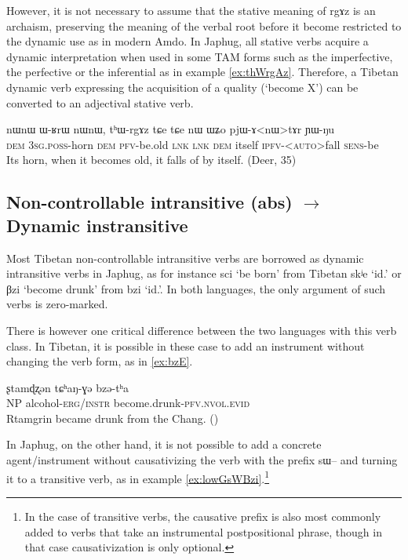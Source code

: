 \documentclass[oldfontcommands,oneside,a4paper,11pt]{article}
\newcommand{\ipa}[1]{{\phon \mbox{#1}}} %
\begin{document}
However, it is not necessary to assume that the stative meaning of \ipa{rgɤz} is an archaism, preserving the meaning of the verbal root before it become restricted to the dynamic use as in modern Amdo. In Japhug, all stative verbs acquire a dynamic interpretation when used in some TAM forms such as the imperfective, the perfective or the inferential as in example \ref{ex:thWrgAz}. Therefore, a Tibetan dynamic verb expressing the acquisition of a quality (`become X') can be converted to an adjectival stative verb.

\begin{exe}
\ex \label{ex:thWrgAz}
\gll
\ipa{nɯnɯ}  	\ipa{ɯ-ʁrɯ}  	\ipa{nɯnɯ,}  	\ipa{tʰɯ-rgɤz}  	\ipa{tɕe}  	\ipa{tɕe}  	\ipa{nɯ}  	\ipa{ɯʑo}  	\ipa{pjɯ-ɤ<nɯ>tɤr}  	\ipa{ɲɯ-ŋu}  \\
\textsc{dem} \textsc{3sg.poss}-horn \textsc{dem} \textsc{pfv}-be.old \textsc{lnk}  \textsc{lnk} \textsc{dem} itself \textsc{ipfv}-<\textsc{auto}>fall \textsc{sens}-be \\
\glt Its horn, when it becomes old, it falls of by itself. (Deer, 35)
\end{exe}


\subsection{Non-controllable intransitive (abs) $\rightarrow$ Dynamic instransitive}  
Most Tibetan non-controllable intransitive verbs are borrowed as dynamic intransitive verbs in Japhug, as for instance \ipa{sci} `be born' from Tibetan \ipa{skʲe} `id.' or \ipa{βzi} `become drunk' from \ipa{bzi} `id.'. In both languages, the only argument of such verbs is zero-marked.

There is however one critical difference between the two languages with this verb class. In Tibetan, it is possible in these case to add an instrument without changing the verb form, as in \ref{ex:bzE}.

\begin{exe}
\ex \label{ex:bzE}
\gll
\ipa{ʂtamɖʐən} 	\ipa{tɕʰaŋ-ɣə} \ipa{bzə-tʰa} 	 \\
NP alcohol-\textsc{erg/instr} become.drunk-\textsc{pfv.nvol.evid} \\
\glt Rtamgrin became drunk from the Chang. (\citealt[112:443]{haller04themchen})
\end{exe}

In Japhug, on the other hand, it is not possible to add a concrete agent/instrument without causativizing the verb with the prefix \ipa{sɯ--} and turning it to a transitive verb, as in example \ref{ex:lowGsWBzi}.\footnote{In the case of transitive verbs, the causative prefix is also most commonly added to verbs that take an instrumental postpositional phrase, though in that case causativization is only optional.}
\end{document}
